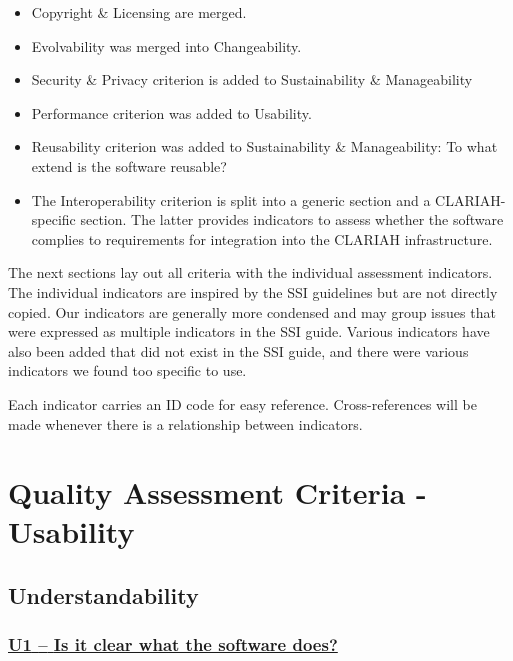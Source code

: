 \documentclass[a4paper,11pt]{article}
\newcommand{\indicator}[1]{\subsubsection*{\underline{#1}}}
\begin{document}
\begin{itemize}
\item Copyright \& Licensing are merged.
\item Evolvability was merged into Changeability.
\item Security \& Privacy criterion is added to Sustainability \& Manageability
\item Performance criterion was added to Usability.
\item Reusability criterion was added to Sustainability \& Manageability: To what extend is the software reusable?
%
%
%
\item The Interoperability criterion is split into a generic section and a CLARIAH-specific section. The latter provides indicators to assess
whether the software complies to requirements for integration into the CLARIAH infrastructure.
\end{itemize}

The next sections lay out all criteria with the individual assessment
indicators. The individual indicators are inspired by the SSI guidelines but
are not directly copied. Our indicators are generally more condensed and may
group issues that were expressed as multiple indicators in the SSI guide.
Various indicators have also been added that did not exist in the SSI guide,
and there were various indicators we found too specific to use.

Each indicator carries an ID code for easy reference. Cross-references will be
made whenever there is a relationship between indicators.

\section{Quality Assessment Criteria - Usability}

\subsection{Understandability}\label{sec:und}

\newcommand{\uOneName}{U1}
\newcommand{\uOneID}{\uOneName}
\newcommand{\uOneText}{Is it clear what the software does?}
\indicator{\uOneName{ }--{ }\uOneText}\label{id:u1}
\end{document}
